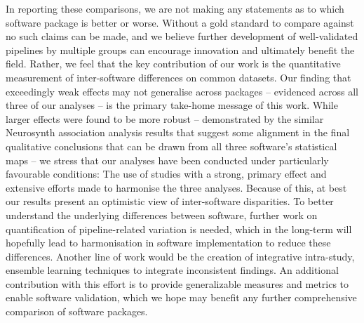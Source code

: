 In reporting these comparisons, we are not making any statements as to which software package is better or worse. Without a gold standard to compare against no such claims can be made, and we believe further development of well-validated pipelines by multiple groups can encourage innovation and ultimately benefit the field. Rather, we feel that the key contribution of our work is the quantitative measurement of inter-software differences on common datasets. Our finding that exceedingly weak effects may not generalise across packages -- evidenced across all three of our analyses -- is the primary take-home message of this work. While larger effects were found to be more robust -- demonstrated by the similar Neurosynth association analysis results that suggest some alignment in the final qualitative conclusions that can be drawn from all three software's statistical maps -- we stress that our analyses have been conducted under particularly favourable conditions: The use of studies with a strong, primary effect and extensive efforts made to harmonise the three analyses. Because of this, at best our results present an optimistic view of inter-software disparities. To better understand the underlying differences between software, further work on quantification of pipeline-related variation is needed, which in the long-term will hopefully lead to harmonisation in software implementation to reduce these differences. Another line of work would be the creation of integrative intra-study, ensemble learning techniques to integrate inconsistent findings. An additional contribution with this effort is to provide generalizable measures and metrics to enable software validation, which we hope may benefit any further comprehensive comparison of software packages.
